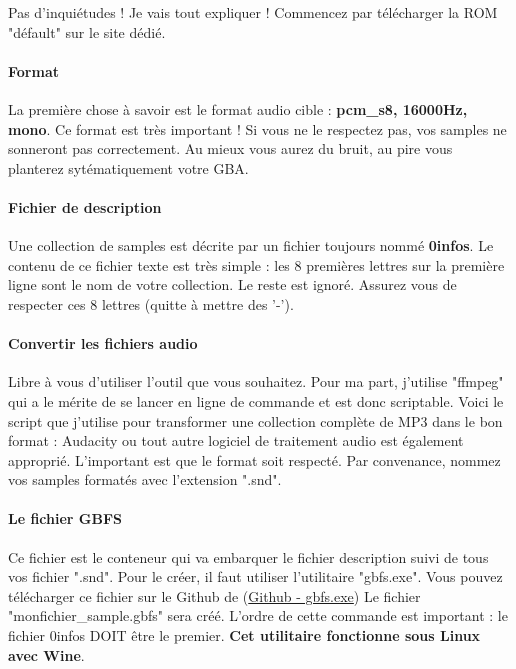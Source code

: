 \documentclass[12pt,a4paper]{article}
\begin{document}
    Pas d'inquiétudes ! Je vais tout expliquer !
    Commencez par télécharger la ROM "défault" sur le site dédié.

    \paragraph{Format} La première chose à savoir est le format audio cible : {\bf pcm\_s8, 16000Hz, mono}.
    Ce format est très important ! Si vous ne le respectez pas, vos samples ne sonneront pas correctement.
    Au mieux vous aurez du bruit, au pire vous planterez sytématiquement votre GBA.

    \paragraph{Fichier de description} Une collection de samples est décrite par un fichier toujours nommé {\bf 0infos}.
    Le contenu de ce fichier texte est très simple : les 8 premières lettres sur la première ligne sont le nom de votre collection.
    Le reste est ignoré. Assurez vous de respecter ces 8 lettres (quitte à mettre des '-').

    \paragraph{Convertir les fichiers audio} Libre à vous d'utiliser l'outil que vous souhaitez.
    Pour ma part, j'utilise "ffmpeg" qui a le mérite de se lancer en ligne de commande et est donc scriptable.
    Voici le script que j'utilise pour transformer une collection complète de MP3 dans le bon format :
    Audacity ou tout autre logiciel de traitement audio est également approprié.
    L'important est que le format soit respecté.
    Par convenance, nommez vos samples formatés avec l'extension ".snd".

    \paragraph{Le fichier GBFS} Ce fichier est le conteneur qui va embarquer le fichier description suivi de tous vos fichier ".snd".
    Pour le créer, il faut utiliser l'utilitaire "gbfs.exe".
    Vous pouvez télécharger ce fichier sur le Github de \FAT (\href{https://github.com/cbrouillard/furiousadvancetracker/blob/master/gbfs.exe?raw=true}{Github - gbfs.exe})
    Le fichier "monfichier\_sample.gbfs" sera créé.
    L'ordre de cette commande est important : le fichier 0infos DOIT être le premier.
    {\bf Cet utilitaire fonctionne sous Linux avec Wine}.
\end{document}
